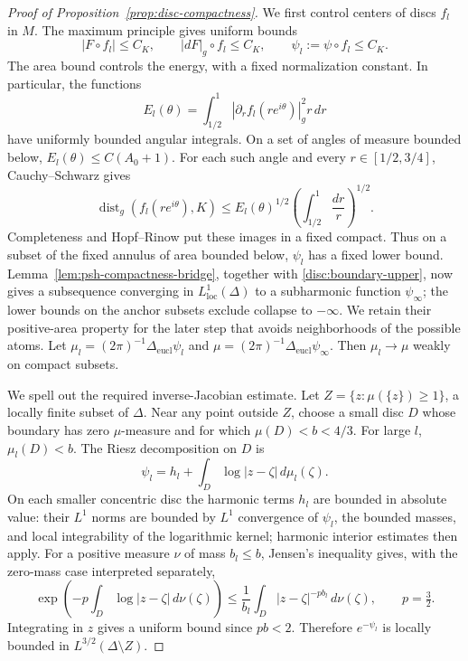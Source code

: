 \documentclass[11pt]{article}
\theoremstyle{definition}
\theoremstyle{remark}
\DeclareMathOperator{\dist}{dist}
\numberwithin{equation}{section}
\begin{document}
\begin{proof}[Proof of Proposition~\ref{prop:disc-compactness}]
We first control centers of discs $f_l$ in $M$.  The maximum principle
gives uniform bounds
\begin{equation}\label{disc:boundary-upper}
 |F\circ f_l|\le C_K,\qquad
 |dF|_g\circ f_l\le C_K,\qquad
 \psi_l:=\psi\circ f_l\le C_K.
\end{equation}
The area bound controls the energy, with a fixed normalization
constant.  In particular, the functions
\[
 E_l(\theta)=\int_{1/2}^1
          |\partial_rf_l(re^{i\theta})|_g^2r\,dr
\]
have uniformly bounded angular integrals.  On a set of angles of
measure bounded below, $E_l(\theta)\le C(A_0+1)$.  For each such
angle and every $r\in[1/2,3/4]$, Cauchy--Schwarz gives
\[
 \dist_g(f_l(re^{i\theta}),K)
 \le E_l(\theta)^{1/2}
       \left(\int_{1/2}^1\frac{dr}{r}\right)^{1/2}.
\]
Completeness and Hopf--Rinow put these images in a fixed compact.
Thus on a subset of the fixed annulus of area bounded below,
$\psi_l$ has a fixed lower bound.  Lemma~\ref{lem:psh-compactness-bridge}, together with
\eqref{disc:boundary-upper}, now gives a subsequence converging in
$L^1_{\mathrm{loc}}(\Delta)$ to a subharmonic function
$\psi_\infty$; the lower bounds on the anchor subsets exclude
collapse to $-\infty$.  We retain their positive-area property for
the later step that avoids neighborhoods of the possible atoms.  Let
$\mu_l=(2\pi)^{-1}\Delta_{\mathrm{eucl}}\psi_l$ and
$\mu=(2\pi)^{-1}\Delta_{\mathrm{eucl}}\psi_\infty$.
Then $\mu_l\to\mu$ weakly on compact subsets.

We spell out the required inverse-Jacobian estimate.  Let
$Z=\{z:\mu(\{z\})\ge1\}$, a locally finite subset of $\Delta$.
Near any point outside $Z$, choose a small disc $D$ whose boundary
has zero $\mu$-measure and for which $\mu(D)<b<4/3$.
For large $l$, $\mu_l(D)<b$.  The Riesz decomposition on $D$
\cite[Chapter~I, Proposition~4.22]{DemaillyBook} is
\[
 \psi_l=h_l+\int_D\log|z-\zeta|\,d\mu_l(\zeta).
\]
On each smaller concentric disc the harmonic terms $h_l$ are bounded
in absolute value: their $L^1$ norms are bounded by $L^1$ convergence
of $\psi_l$, the bounded masses, and local integrability of the
logarithmic kernel; harmonic interior estimates then apply.
For a positive measure $\nu$ of mass $b_l\le b$, Jensen's inequality
gives, with the zero-mass case interpreted separately,
\[
 \exp\left(-p\int_D\log|z-\zeta|\,d\nu(\zeta)\right)
 \le\frac1{b_l}\int_D|z-\zeta|^{-pb_l}\,d\nu(\zeta),
 \qquad p=\tfrac32.
\]
Integrating in $z$ gives a uniform bound since $pb<2$.  Therefore
$e^{-\psi_l}$ is locally bounded in $L^{3/2}(\Delta\setminus Z)$.


\end{proof}
\end{document}
